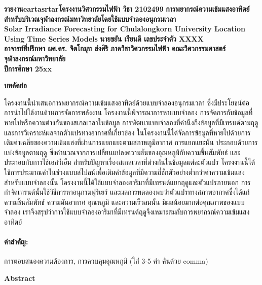 \documentclass[11pt,a4paper]{article}
\begin{document}
\thispagestyle{empty}
\begin{center}
\doublespacing
{\LARGE \bf รายงานeartasrtarโครงงานวิศวกรรมไฟฟ้า วิชา 2102499}
\vfill
{ 
\LARGE \bf
การพยากรณ์ความเข้มแสงอาทิตย์สำหรับบริเวณจุฬาลงกรณ์มหาวิทยาลัยโดยใช้แบบจำลองอนุกรมเวลา \\[2ex]
Solar Irradiance Forecasting for Chulalongkorn University Location Using Time Series Models
}
\vfill
{\LARGE \bf นายขยัน เรียนดี เลขประจำตัว XXXX}\\[2ex]
{\LARGE \bf อาจารย์ที่ปรึกษา ผศ.ดร. จิตโกมุท ส่งศิริ}
\vfill
{\LARGE \bf ภาควิชาวิศวกรรมไฟฟ้า คณะวิศวกรรมศาสตร์}\\[2ex]
{\LARGE \bf จุฬาลงกรณ์มหาวิทยาลัย}\\[2ex]
{\LARGE \bf ปีการศึกษา 25xx}
\end{center}

\newpage
\thispagestyle{empty}
\begin{center}
\textbf{บทคัดย่อ}
\end{center}

โครงงานนี้นำเสนอการพยากรณ์ความเข้มแสงอาทิตย์ด้วยแบบจำลองอนุกรมเวลา ซึ่งมีประโยชน์ต่อการนำไปใช้งานด้านการจัดการพลังงาน โครงงานนี้พิจารณาการหาแบบจำลอง การจัดการกับข้อมูลที่หายไปหรือความต่างกันของสเกลเวลาในข้อมูล การพัฒนาแบบจำลองที่คำนึงถึงข้อมูลที่มีเทรนด์ตามฤดู และการวิเคราะห์ผลจากตัวแปรทางอากาศที่เกี่ยวข้อง ในโครงงานนี้ได้จัดการข้อมูลที่หายไปด้วยการเติมค่าเฉลี่ยของความเข้มแสงที่ผ่านการแยกแยะตามสภาพภูมิอากาศ การแยกแยะนั้น ประกอบด้วยการแบ่งข้อมูลตามฤดู ซึ่งคำนวณจากการเปลี่ยนแปลงความชันของอุณหภูมิกับความชื้นสัมพัทธ์ และประกอบกับการใช้เอสวีเอ็ม สำหรับปัญหาเรื่องสเกลเวลาที่ต่างกันในข้อมูลแต่ละตัวแปร โครงงานนี้ได้ใช้การประมาณค่าในช่วงแบบสไปลน์เพื่อเติมค่าข้อมูลที่มีความถี่ชักตัวอย่างต่ำกว่าค่าความเข้มแสง สำหรับแบบจำลองนั้น โครงงานนี้ได้ใช้แบบจำลองอาริมาที่มีเทรนด์แยกฤดูและตัวแปรภายนอก การกำจัดเทรนด์นั้นใช้วิธีการหาอนุกรมฟูริเยร์ และผลการทดลองพบว่าตัวแปรทางสภาพอากาศซึ่งได้แก่ ความชื้นสัมพัทธ์ ความดันอากาศ อุณหภูมิ และความเร็วลมนั้น มีผลน้อยมากต่อคุณภาพของแบบจำลอง เราจึงสรุปว่าการใช้แบบจำลองอาริมาที่มีเทรนด์ฤดูจึงเหมาะสมกับการพยากรณ์ความเข้มแสงอาทิตย์

\paragraph{\textbf คำสำคัญ:} การตอบสนองความต้องการ, การควบคุมอุณหภูมิ (ใส่ 3-5 คำ คั่นด้วย comma)

\begin{center}
\textbf{Abstract}
\end{center}
\end{document}
